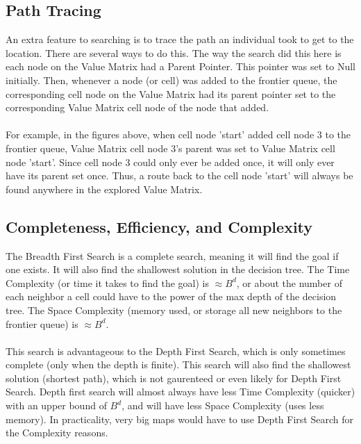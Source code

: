 \documentclass[12pt]{article}
\begin{document}
\subsection{Path Tracing}
An extra feature to searching is to trace the path an individual took to get to the location. There are several ways to do this. The way the search did this here is each node on the Value Matrix had a Parent Pointer. This pointer was set to Null initially. Then, whenever a node (or cell) was added to the frontier queue, the corresponding cell node on the Value Matrix had its parent pointer set to the corresponding Value Matrix cell node
of the node that added.
\\ \\
For example, in the figures above, when cell node 'start' added cell node 3 to the frontier queue, Value Matrix cell node 3's parent was set to Value Matrix cell node 'start'. Since cell node 3 could only ever be added once, it will only ever have its parent set once. Thus, a route back to the cell node 'start' will always be found anywhere in the explored Value Matrix.
\subsection{Completeness, Efficiency, and Complexity}
The Breadth First Search is a complete search, meaning it will find the goal if one exists. It will also find the shallowest solution in the decision tree. The Time Complexity (or time it takes to find the goal) is $\approx B^{d}$, or about the number of each neighbor a cell could have to the power of the max depth of the decision tree. The Space Complexity (memory used, or storage all new neighbors to the frontier queue) is $\approx B^{d}$.
\\ \\
This search is advantageous to the Depth First Search, which is only sometimes complete (only when the depth is finite). This search will also find the shallowest solution (shortest path), which is not gaurenteed or even likely for Depth First Search. Depth first search will almost always have less Time Complexity (quicker) with an upper bound of $B^{d}$, and will have less Space Complexity (uses less memory). In practicality, very big maps would have to use Depth First Search for the Complexity reasons.
\pagebreak
\end{document}
